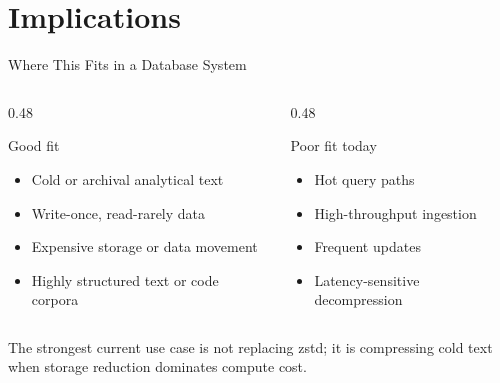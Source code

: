 
\section{Implications}

\begin{frame}{Where This Fits in a Database System}
  \begin{columns}[T, onlytextwidth]
    \begin{column}{0.48\textwidth}
      \begin{block}{Good fit}
        \begin{itemize}
          \item Cold or archival analytical text
          \item Write-once, read-rarely data
          \item Expensive storage or data movement
          \item Highly structured text or code corpora
        \end{itemize}
      \end{block}
    \end{column}
    \hfill
    \begin{column}{0.48\textwidth}
      \begin{block}{Poor fit today}
        \begin{itemize}
          \item Hot query paths
          \item High-throughput ingestion
          \item Frequent updates
          \item Latency-sensitive decompression
        \end{itemize}
      \end{block}
    \end{column}
  \end{columns}

  \vspace{0.8em}
  \centering
  \small The strongest current use case is not replacing zstd; it is compressing cold text when storage reduction dominates compute cost.
\end{frame}

